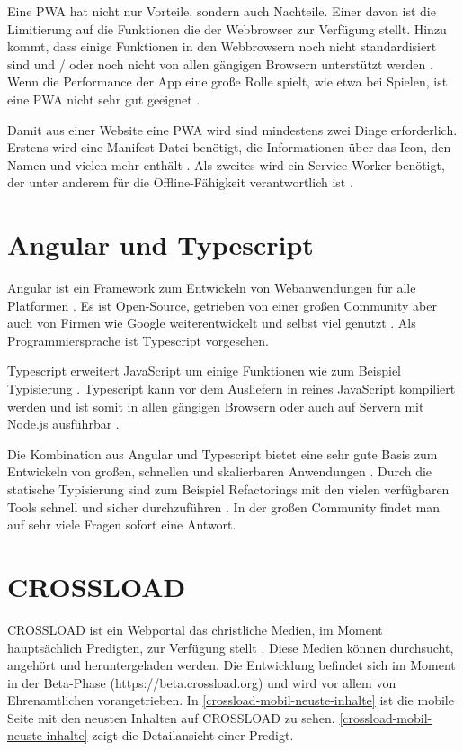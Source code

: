 Eine \ac{PWA} hat nicht nur Vorteile, sondern auch Nachteile. Einer davon ist die Limitierung auf die Funktionen die der Webbrowser zur Verfügung stellt. Hinzu kommt, dass einige Funktionen in den Webbrowsern noch nicht standardisiert sind und / oder noch nicht von allen gängigen Browsern unterstützt werden \autocite{majchrzak2018} \autocite{biorn2017}. Wenn die Performance der App eine große Rolle spielt, wie etwa bei Spielen, ist eine \ac{PWA} nicht sehr gut geeignet \autocite{biorn2017}.

Damit aus einer Website eine \ac{PWA} wird sind mindestens zwei Dinge erforderlich. Erstens wird eine Manifest Datei benötigt, die Informationen über das Icon, den Namen und vielen mehr enthält \autocite{Hajian2019} \autocite{Rojas2020}. Als zweites wird ein Service Worker benötigt, der unter anderem für die Offline-Fähigkeit verantwortlich ist \autocite{Rojas2020}. 


\section{Angular und Typescript}
Angular ist ein Framework zum Entwickeln von Webanwendungen für alle Platformen \autocite{angular-io}. Es ist Open-Source, getrieben von einer großen Community aber auch von Firmen wie Google weiterentwickelt und selbst viel genutzt \autocite{angular-io}. Als Programmiersprache ist Typescript vorgesehen. 

Typescript erweitert JavaScript um einige Funktionen wie zum Beispiel Typisierung \autocite{typescript-org}. Typescript kann vor dem Ausliefern in reines JavaScript kompiliert werden und ist somit in allen gängigen Browsern oder auch auf Servern mit Node.js ausführbar \autocite{typescript-org}.

Die Kombination aus Angular und Typescript bietet eine sehr gute Basis zum Entwickeln von großen, schnellen und skalierbaren Anwendungen \autocite{angular-io}. Durch die statische Typisierung sind zum Beispiel Refactorings mit den vielen verfügbaren Tools schnell und sicher durchzuführen \autocite{typescript-org} \autocite{angular-io}. In der großen Community findet man auf sehr viele Fragen sofort eine Antwort.

\section{CROSSLOAD}
CROSSLOAD ist ein Webportal das christliche Medien, im Moment hauptsächlich Predigten, zur Verfügung stellt \autocite{crossload-org}. Diese Medien können durchsucht, angehört und heruntergeladen werden. Die Entwicklung befindet sich im Moment in der Beta-Phase (https://beta.crossload.org) und wird vor allem von Ehrenamtlichen vorangetrieben. In \autoref{crossload-mobil-neuste-inhalte} ist die mobile Seite mit den neusten Inhalten auf CROSSLOAD zu sehen. \autoref{crossload-mobil-neuste-inhalte} zeigt die Detailansicht einer Predigt.

